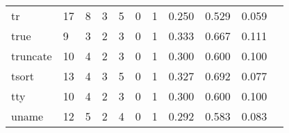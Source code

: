 \begin{longtable}{lp{1.2cm}p{1.2cm}p{1.2cm}p{1.2cm}p{1.2cm}p{1.2cm}p{1.2cm}p{1.2cm}p{1.2cm}p{1.2cm}}
tr        &                                    17 &                                                  8 &                                                  3 &                                                  5 &                                                  0 &                                                  1 &                                              0.250 &                                              0.529 &                                              0.059 \\
true      &                                     9 &                                                  3 &                                                  2 &                                                  3 &                                                  0 &                                                  1 &                                              0.333 &                                              0.667 &                                              0.111 \\
truncate  &                                    10 &                                                  4 &                                                  2 &                                                  3 &                                                  0 &                                                  1 &                                              0.300 &                                              0.600 &                                              0.100 \\
tsort     &                                    13 &                                                  4 &                                                  3 &                                                  5 &                                                  0 &                                                  1 &                                              0.327 &                                              0.692 &                                              0.077 \\
tty       &                                    10 &                                                  4 &                                                  2 &                                                  3 &                                                  0 &                                                  1 &                                              0.300 &                                              0.600 &                                              0.100 \\
uname     &                                    12 &                                                  5 &                                                  2 &                                                  4 &                                                  0 &                                                  1 &                                              0.292 &                                              0.583 &                                              0.083 \\

\end{longtable}

